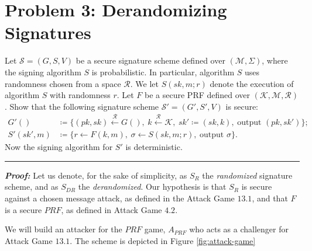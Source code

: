 \section{Problem 3: Derandomizing Signatures}\label{sec:problem3}

Let $\mathcal{S} = (G, S, V)$ be a secure signature scheme defined over $(\mathcal{M}, \Sigma)$, where the signing algorithm $S$ is probabilistic.
In particular, algorithm $S$ uses randomness chosen from a space $\mathcal{R}$.
We let $S(sk,m;r)$ denote the execution of algorithm $S$ with randomness $r$.
Let $F$ be a secure PRF defined over $(\mathcal{K}, \mathcal{M}, \mathcal{R})$.
Show that the following signature scheme $\mathcal{S'} = (G', S', V)$ is secure:
\begin{equation*}
    \begin{split}
        G'() &\coloneqq \{ (pk, sk) \overset{\mathcal{R}}{\longleftarrow} G(), 
            \hspace{3pt} k \overset{\mathcal{R}}{\longleftarrow} \mathcal{K}, 
            \hspace{3pt} sk' \coloneqq (sk, k), 
            \hspace{3pt} \text{output } (pk, sk') \}; \\
        S'(sk', m) &\coloneqq \{ r \longleftarrow F(k, m),
            \hspace{3pt} \sigma \longleftarrow S(sk, m; r),
            \hspace{3pt} \text{output } \sigma \}.
    \end{split}
\end{equation*}
Now the signing algorithm for $S'$ is deterministic.

\begin{center}
    \rule{5cm}{0.4pt}
\end{center}

\textbf{\textit{Proof:}}
Let us denote, for the sake of simplicity, as $S_{R}$ the \textit{randomized} signature scheme, and as $S_{DR}$ the \textit{derandomized}.
Our hypothesis is that $S_R$ is secure against a chosen message attack, as defined in the Attack Game $13.1$, and that $F$ is a secure $PRF$, as defined in Attack Game $4.2$.

We will build an attacker for the $PRF$ game, $A_{PRF}$ who acts as a challenger for Attack Game $13.1$.
The scheme is depicted in Figure \ref{fig:attack-game}

